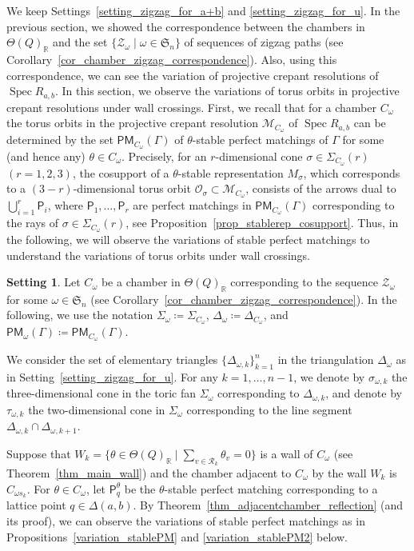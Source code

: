 \documentclass[pdftex]{sigma}
\numberwithin{equation}{section}
\theoremstyle{definition}
\newtheorem{Setting}[Theorem]{Setting}
\newcommand{\RR}{\mathbb{R}}
\newcommand{\calM}{\mathcal{M}}
\newcommand{\calO}{\mathcal{O}}
\newcommand{\calR}{\mathcal{R}}
\newcommand{\calZ}{\mathcal{Z}}
\newcommand{\fkS}{\mathfrak{S}}
\newcommand{\sfP}{\mathsf{P}}
\newcommand{\Spec}{\operatorname{Spec}}
\newcommand{\PM}{\mathsf{PM}}
\newcommand{\permII}{\omega}
\begin{document}
We keep Settings~\ref{setting_zigzag_for_a+b} and \ref{setting_zigzag_for_u}.
In the previous section, we showed the correspondence between the chambers in $\Theta(Q)_\RR$ and the set $\{\calZ_\permII \mid \permII\in\fkS_n\}$
of sequences of zigzag paths (see Corollary~\ref{cor_chamber_zigzag_correspondence}).
Also, using this correspondence, we can see the variation of projective crepant resolutions of $\Spec R_{a,b}$.
In this section, we observe the variations of torus orbits in projective crepant resolutions under wall crossings.
First, we recall that for a chamber $C_\permII$ the torus orbits in the projective crepant resolution $\calM_{C_\permII}$ of $\Spec R_{a,b}$
can be determined by the set $\PM_{C_\permII}(\Gamma)$ of $\theta$-stable perfect matchings of $\Gamma$
for some (and hence any) $\theta\in C_\permII$.
Precisely, for an $r$-dimensional cone $\sigma\in\Sigma_{C_\permII}(r)$ $(r=1,2,3)$,
the cosupport of a $\theta$-stable representation $M_\sigma$, which corresponds to a $(3-r)$-dimensional torus orbit $\calO_\sigma\subset\calM_{C_\permII}$,
consists of the arrows dual to $\bigcup_{i=1}^r\sfP_i$, where $\sfP_1, \dots, \sfP_r$ are perfect matchings in $\PM_{C_\permII}(\Gamma)$ corresponding to the rays of $\sigma\in\Sigma_{C_\permII}(r)$, see Proposition~\ref{prop_stablerep_cosupport}.
Thus, in the following, we will observe the variations of stable perfect matchings to understand the variations of torus orbits under wall crossings.


\begin{Setting}
\label{setting_stablerep}
Let $C_\permII$ be a chamber in $\Theta(Q)_\RR$ corresponding to the sequence $\calZ_\permII$ for some $\permII\in\fkS_n$ (see Corollary~\ref{cor_chamber_zigzag_correspondence}).
In the following, we use the notation $\Sigma_{\permII}\coloneqq\Sigma_{C_\permII}$, $\Delta_\permII\coloneqq\Delta_{C_\permII}$,
and $\PM_\permII(\Gamma)\coloneqq\PM_{C_\permII}(\Gamma)$.

We consider the set of elementary triangles $\{\Delta_{\permII,k}\}_{k=1}^n$ in the triangulation $\Delta_{\permII}$ as in Setting~\ref{setting_zigzag_for_u}.
For any $k=1, \dots, n-1$, we denote by $\sigma_{\permII, k}$ the three-dimensional cone in the toric fan $\Sigma_{\permII}$ corresponding to $\Delta_{\permII,k}$,
and denote by $\tau_{\permII, k}$ the two-dimensional cone in $\Sigma_{\permII}$ corresponding to the line segment $\Delta_{\permII,k}\cap\Delta_{\permII,k+1}$.
\end{Setting}

Suppose that $W_k=\bigl\{\theta\in\Theta(Q)_\RR \mid \sum_{v\in\calR_k}\theta_v=0\bigr\}$ is a wall of $C_\permII$ (see Theorem~\ref{thm_main_wall})
and the chamber adjacent to $C_\permII$ by the wall $W_k$ is $C_{\permII s_k}$.
For $\theta\in C_\permII$, let $\sfP^\theta_q$ be the $\theta$-stable perfect matching corresponding to a lattice point $q\in\Delta(a,b)$.
By Theorem~\ref{thm_adjacentchamber_reflection} (and its proof),
we can observe the variations of stable perfect matchings as in Propositions~\ref{variation_stablePM} and \ref{variation_stablePM2} below.
\end{document}
